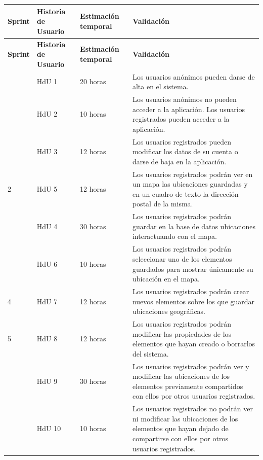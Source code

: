 \begin{longtable}{p{1cm} p{4cm} p{4cm} p{6cm}}
  	\hline  	    
  	\multicolumn{1}{p{1cm}}{\cellcolor{black!30}\textbf{Sprint}} &
    \multicolumn{1}{p{4cm}}{\cellcolor{black!30}\textbf{Historia de Usuario}} & 
 	\multicolumn{1}{p{4cm}}{\cellcolor{black!30}\textbf{Estimación temporal}} &
 	\multicolumn{1}{p{6cm}}{\cellcolor{black!30}\textbf{Validación}}
 	\\
 	\toprule 
   	\endfirsthead
	     
    \hline
  	\multicolumn{1}{p{1cm}}{\cellcolor{black!30}\textbf{Sprint}} &
    \multicolumn{1}{p{4cm}}{\cellcolor{black!30}\textbf{Historia de Usuario}} & 
 	\multicolumn{1}{p{4cm}}{\cellcolor{black!30}\textbf{Estimación temporal}} &
 	\multicolumn{1}{p{6cm}}{\cellcolor{black!30}\textbf{Validación}}
 	\\	 
 	\toprule
 	\endhead

	\rowcolor{gray!25}
	\multirow{3}{*}{1}	& HdU 1	&	20 horas	&	Los usuarios anónimos pueden darse de alta en el sistema. \\ 
	\rowcolor{gray!25}	& HdU 2	&	10 horas	&	Los usuarios anónimos no pueden acceder a la aplicación. Los usuarios registrados 														pueden acceder a la aplicación. \\ 
	\rowcolor{gray!25}	& HdU 3	&	12 horas	&	Los usuarios registrados pueden modificar los datos de su cuenta o darse de baja en 														la aplicación.  \\                      
	
	2	& HdU 5		&	12 horas	&	Los usuarios registrados podrán ver en un mapa las ubicaciones guardadas y en un cuadro de 												texto la dirección postal de la misma.\\
	\rowcolor{gray!25}
	\multirow{2}{*}{3}	& HdU 4		&	30 horas	&	Los usuarios registrados podrán guardar en la base de datos ubicaciones 																	interactuando con el mapa. \\
	\rowcolor{gray!25}	& HdU 6		&	10 horas	&	Los usuarios registrados podrán seleccionar uno de los elementos 																			guardados para mostrar únicamente su ubicación en el mapa. \\
	
	4	& HdU 7		&	12 horas	&	Los usuarios registrados podrán crear nuevos elementos sobre los que guardar ubicaciones 													geográficas. \\
	\rowcolor{gray!25}

	5	& HdU 8		&	12 horas	&	Los usuarios registrados podrán modificar las propiedades de los elementos que hayan creado o 											borrarlos del sistema. \\
	\rowcolor{gray!25}
	\multirow{2}{*}{6}	& HdU 9		&	30 horas	&	Los usuarios registrados podrán ver y modificar las ubicaciones de los elementos 															previamente compartidos con ellos por otros usuarios registrados. \\
	\rowcolor{gray!25}	& HdU 10	&	10 horas	&	Los usuarios registrados no podrán ver ni modificar las ubicaciones de los 																elementos que hayan dejado de compartirse con ellos por otros usuarios 																	registrados. \\


\end{longtable}
